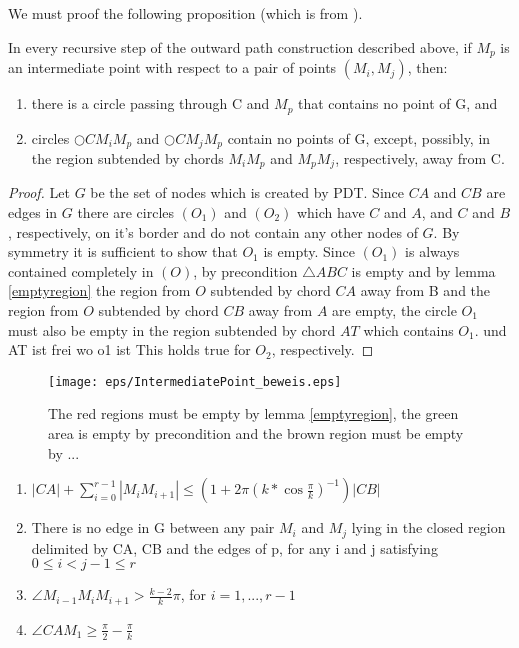 We must proof the following proposition (which is from \cite{kanj}).

\begin{prop}
In every recursive step of the outward path construction described above, if $M_p $ is an intermediate point with respect to a pair of points $(M_i, M_j) $, then:
\begin{enumerate}
\item there is a circle passing through C and $M_p $ that contains no point of G, and
\item circles $\bigcirc{CM_iM_p} $ and $\bigcirc{CM_jM_p} $ contain no points of G, except, possibly, in the region subtended by chords $M_iM_p $ and $M_pM_j $, respectively, away from C.
\end{enumerate}
\end{prop}

\begin{proof}
Let $G $ be the set of nodes which is created by PDT. 
Since $CA $ and $CB $ are edges in $G $ there are circles $(O_1) $ and $(O_2) $ which have $C $ and $A $, and $C $ and $B $, respectively, on it's border and do not contain any other nodes of $G $. 
By symmetry it is sufficient to show that $O_1 $ is empty.
Since $(O_1) $ is always contained completely in $(O) $, by precondition $\triangle{ABC} $ is empty and by lemma \ref{emptyregion} the region from $O $ subtended by chord $CA $ away from B and the region from $O $ subtended by chord $CB $ away from $A $ are empty, the circle $O_1 $ must also be empty in the region subtended by chord $AT $ which contains $O_1 $. und AT ist frei wo o1 ist
This holds true for $O_2 $, respectively.
 
\end{proof}
\begin{figure}[h!]
\centering
\texttt{[image: eps/IntermediatePoint\_beweis.eps]}
\caption{The red regions must be empty by lemma \ref{emptyregion}, the green area is empty by precondition and the brown region must be empty by ... }
\label{fig:intermediate_point_beweis}
\end{figure}


\begin{enumerate}
\item $|CA| + \sum\nolimits_{i=0}^{r-1} |M_iM_{i+1}| \leq (1+2\pi (k*\cos{\frac{\pi}{k}})^{-1})|CB| $
\item There is no edge in G between any pair $M_i $ and $M_j $ lying in the closed region delimited by CA, CB and the edges of p, for any i and j satisfying $0 \leq i < j-1 \leq r $ 
\item $\angle{M_{i-1}M_iM_{i+1}} > \frac{k-2}{k}\pi $, for $i=1, ..., r-1 $ 
\item $\angle{CAM_1} \geq \frac{\pi}{2}-\frac{\pi}{k} $
\end{enumerate}


